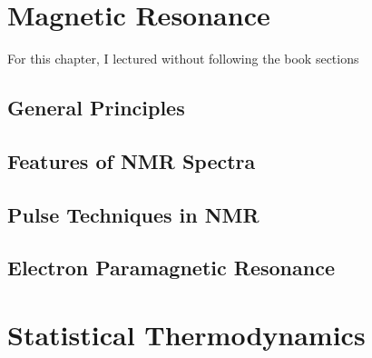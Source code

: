 \documentclass[12pt, openany, letterpaper]{memoir}
\begin{document}
\chapter{Magnetic Resonance}
For this chapter, I lectured without following the book sections

\section{General Principles}

\section{Features of NMR Spectra}

\section{Pulse Techniques in NMR}

\section{Electron Paramagnetic Resonance}

\chapter{Statistical Thermodynamics}
\end{document}
